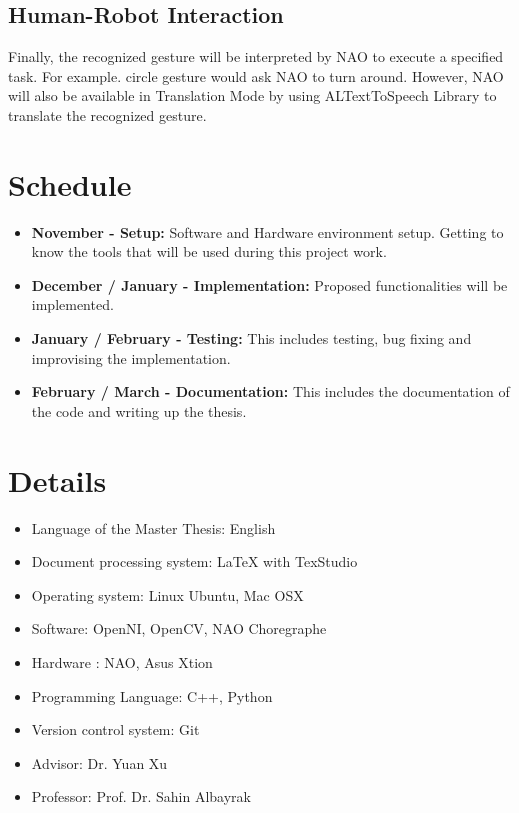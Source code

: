 \section{Human-Robot Interaction}
Finally, the recognized gesture will be interpreted by NAO to execute a specified task. For example. circle gesture would ask NAO to turn around. However, NAO will also be available in Translation Mode by using ALTextToSpeech Library to translate the recognized gesture.


\chapter{Schedule}
\begin{itemize}
	\item \textbf{November - Setup:} Software and Hardware environment setup. Getting to know the tools that will be used during this project work.
	\item \textbf{December / January - Implementation:} Proposed functionalities will be implemented.
	\item \textbf{January / February - Testing:} This includes testing, bug fixing and improvising the implementation.
	\item \textbf{February / March - Documentation:} This includes the documentation of the code and writing up the thesis.
\end{itemize}

\chapter{Details}
\begin{itemize}
	\item Language of the Master Thesis: English
	\item Document processing system: LaTeX with TexStudio
	\item Operating system: Linux Ubuntu, Mac OSX
	\item Software: OpenNI, OpenCV, NAO Choregraphe
	\item Hardware : NAO, Asus Xtion
	\item Programming Language: C++, Python
	\item Version control system: Git
	\item Advisor: Dr. Yuan Xu
	\item Professor: Prof. Dr. Sahin Albayrak
\end{itemize}

